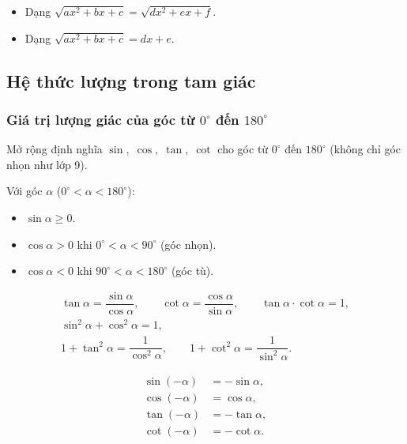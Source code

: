 \documentclass[12pt,a4paper]{article}
\begin{document}
\begin{phuongphap}
  \begin{itemize}
    \item Dạng $\sqrt{ax^2 + bx + c} = \sqrt{dx^2 + ex + f}$.
    \item Dạng $\sqrt{ax^2 + bx + c} = dx + e$.
  \end{itemize}
\end{phuongphap}

\subsection{Hệ thức lượng trong tam giác}

\subsubsection{Giá trị lượng giác của góc từ $0^\circ$ đến $180^\circ$}

\begin{dinhnghia}
  Mở rộng định nghĩa $\sin,\; \cos,\; \tan,\; \cot$ cho góc từ $0^\circ$ đến $180^\circ$ (không chỉ góc nhọn như lớp 9).

  Với góc $\alpha$ ($0^\circ < \alpha < 180^\circ$):
  \begin{itemize}
    \item $\sin\alpha \ge 0$.
    \item $\cos\alpha > 0$ khi $0^\circ < \alpha < 90^\circ$ (góc nhọn).
    \item $\cos\alpha < 0$ khi $90^\circ < \alpha < 180^\circ$ (góc tù).
  \end{itemize}
\end{dinhnghia}

\begin{congthuc}[title={Hệ thức lượng giác cơ bản}]
  \begin{gather*}
    \tan\alpha = \dfrac{\sin\alpha}{\cos\alpha},\qquad
    \cot\alpha = \dfrac{\cos\alpha}{\sin\alpha},\qquad
    \tan\alpha \cdot \cot\alpha = 1, \\[4pt]
    \sin^2\alpha + \cos^2\alpha = 1, \\[4pt]
    1 + \tan^2\alpha = \dfrac{1}{\cos^2\alpha},\qquad
    1 + \cot^2\alpha = \dfrac{1}{\sin^2\alpha}.
  \end{gather*}
\end{congthuc}

\begin{congthuc}[title={Góc đối nhau (cos - đối)}]
  \begin{align*}
    \sin(- \alpha) &= -\sin\alpha, \\
    \cos(- \alpha) &= \cos\alpha, \\
    \tan(- \alpha) &= -\tan\alpha, \\
    \cot(- \alpha) &= -\cot\alpha.
  \end{align*}
\end{congthuc}
\end{document}
